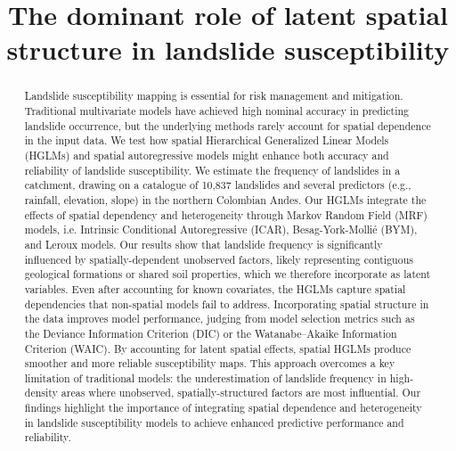 \documentclass[journal abbreviation, manuscript]{copernicus}
\begin{document}
\title{The dominant role of latent spatial structure in landslide susceptibility}





\received{}
\pubdiscuss{} %
\revised{}
\accepted{}
\published{}


\maketitle

\begin{abstract}
Landslide susceptibility mapping is essential for risk management and mitigation. 
Traditional multivariate models have achieved high nominal accuracy in predicting landslide occurrence, but the underlying methods rarely account for spatial dependence in the input data. 
We test how spatial Hierarchical Generalized Linear Models (HGLMs) and spatial autoregressive models might enhance both accuracy and reliability of landslide susceptibility. 
We estimate the frequency of landslides in a catchment, drawing on a catalogue of 10,837 landslides and several predictors (e.g., rainfall, elevation, slope) in the northern Colombian Andes. 
Our HGLMs integrate the effects of spatial dependency and heterogeneity through Markov Random Field (MRF) models, i.e. Intrinsic Conditional Autoregressive (ICAR), Besag-York-Mollié (BYM), and Leroux models. 
Our results show that landslide frequency is significantly influenced by spatially-dependent unobserved factors, likely representing contiguous geological formations or shared soil properties, which we therefore incorporate as latent variables. 
Even after accounting for known covariates, the HGLMs
capture spatial dependencies that non-spatial models fail to address. Incorporating spatial structure in
the data improves model performance, judging from model selection metrics such as the Deviance Information Criterion (DIC) or the Watanabe–Akaike Information Criterion (WAIC). By accounting for latent
spatial effects, spatial HGLMs produce smoother and more reliable susceptibility maps. This approach
overcomes a key limitation of traditional models: the underestimation of landslide frequency in high-
density areas where unobserved, spatially-structured factors are most influential. Our findings highlight
the importance of integrating spatial dependence and heterogeneity in landslide susceptibility models to
achieve enhanced predictive performance and reliability.
\end{abstract}
\end{document}
